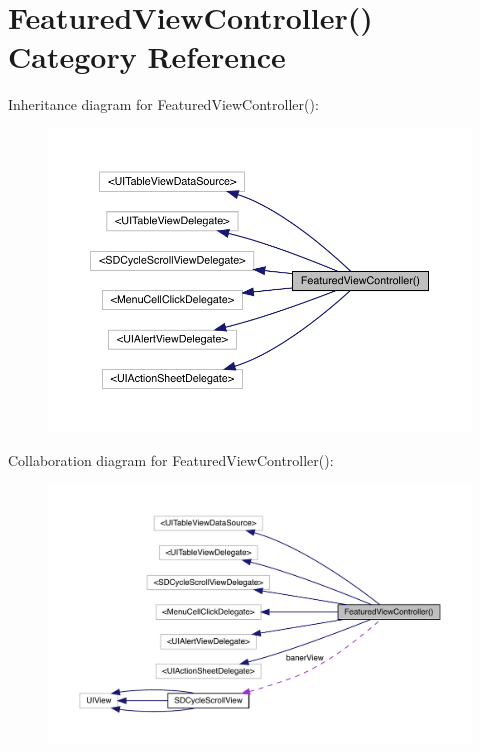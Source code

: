 \hypertarget{category_featured_view_controller_07_08}{}\section{Featured\+View\+Controller() Category Reference}
\label{category_featured_view_controller_07_08}


Inheritance diagram for Featured\+View\+Controller()\+:\nopagebreak
\begin{figure}[H]
\begin{center}
\leavevmode
\includegraphics[width=350pt]{category_featured_view_controller_07_08__inherit__graph}
\end{center}
\end{figure}


Collaboration diagram for Featured\+View\+Controller()\+:\nopagebreak
\begin{figure}[H]
\begin{center}
\leavevmode
\includegraphics[width=350pt]{category_featured_view_controller_07_08__coll__graph}
\end{center}
\end{figure}
